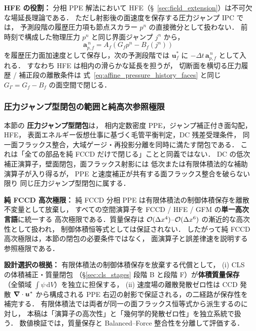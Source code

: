 \noindent\textbf{HFE の役割：}
分相 PPE 解法において HFE（§~\ref{sec:field_extension}）は不可欠な場延長理論である．
ただし射影後の面速度を保存する圧力ジャンプ IPC では，
予測段階の履歴圧力項も節点スカラー $p^n$ の直接微分として扱わない．
前時刻で構成した物理圧力 $p^n$ と同じ界面ジャンプ $j^n$ から，
\begin{equation}
  \label{eq:affine_pressure_history_faces}
  \mathbf{a}^{\,n}_{p,f}
  =
  A_f\left(G_f p^n - B_f(j^n)\right)
\end{equation}
を履歴圧力面加速度として保存し，次の予測段階では
$\mathbf{u}^{*}_f$ に $-\Delta t\,\mathbf{a}^{\,n}_{p,f}$ として入れる．
すなわち HFE は相内の滑らかな延長を担うが，
切断面を横切る圧力履歴 / 補正段の離散条件は
式~\eqref{eq:affine_pressure_history_faces} と同じ
$G_\Gamma=G_f-B_f$ の面空間で閉じる．

\subsubsection{圧力ジャンプ型閉包の範囲と純高次参照極限}
\label{sec:pure_fccd_split_ppe}

本節の \textbf{圧力ジャンプ型閉包}は，
相内定数密度 PPE，ジャンプ補正付き面勾配，HFE，
表面エネルギー仮想仕事に基づく毛管平衡判定，DC 残差受理条件，
同一面フラックス整合，大域ゲージ・再投影分離を同時に満たす閉包である．
これは「全ての部品を純 FCCD だけで閉じる」ことと同義ではない．
DC の低次補正演算子，壁面閉包，面フラックス射影には
低次または有限体積法的な補助演算子が入り得るが，
PPE と速度補正が共有する面フラックス整合を破らない限り
同じ圧力ジャンプ型閉包に属する．

\noindent\textbf{純 FCCD 高次極限：}
純 FCCD 分相 PPE は有限体積法の制御体積保存を離散不変量として放棄し，
すべての空間演算子を FCCD / HFE / GFM の\textbf{単一高次言語}に統一する
高次極限である．質量保存は
$\mathcal{O}(\Delta x^4)$--$\mathcal{O}(\Delta x^6)$ の漸近的な高次性として扱われ，
制御体積恒等式としては保証されない．
したがって純 FCCD 高次極限は，本節の閉包の必要条件ではなく，
面演算子と誤差律速を説明する参照極限である．

\noindent\textbf{設計選択の根拠：}
有限体積法の制御体積保存を放棄する代償として，
(i) CLS の体積補正・質量閉包
（§\ref{sec:cls_stages} 段階 B と段階 F）が\textbf{体積質量保存}
（全領域 $\int\psi\,\mathrm{d}V$）を独立に担保する，
(ii) 速度場の離散発散ゼロ性は CCD 発散 $\bm{\nabla}\cdot\bm{u}^*$ から構成される
PPE 右辺の射影で保証される，の二経路が保存性を補完する．
有限体積法では両者が同一の面フラックス恒等式から派生するのに対し，
本稿は「演算子の高次性」と「幾何学的発散ゼロ性」を独立系統で扱う．
数値検証では，質量保存と Balanced--Force 整合性を分離して評価する．

